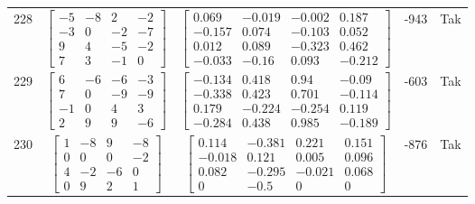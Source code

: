 \documentclass[a4paper,12pt]{article}
\begin{document}
\begin{tabular}{c c c c c}
228
&
$\begin{bmatrix} -5 & -8 & 2 & -2 \\ -3 & 0 & -2 & -7 \\ 9 & 4 & -5 & -2 \\ 7 & 3 & -1 & 0 \end{bmatrix}$
&
$\begin{bmatrix} 0.069 & -0.019 & -0.002 & 0.187 \\ -0.157 & 0.074 & -0.103 & 0.052 \\ 0.012 & 0.089 & -0.323 & 0.462 \\ -0.033 & -0.16 & 0.093 & -0.212 \end{bmatrix}$
&
-943
&
Tak
\\
229
&
$\begin{bmatrix} 6 & -6 & -6 & -3 \\ 7 & 0 & -9 & -9 \\ -1 & 0 & 4 & 3 \\ 2 & 9 & 9 & -6 \end{bmatrix}$
&
$\begin{bmatrix} -0.134 & 0.418 & 0.94 & -0.09 \\ -0.338 & 0.423 & 0.701 & -0.114 \\ 0.179 & -0.224 & -0.254 & 0.119 \\ -0.284 & 0.438 & 0.985 & -0.189 \end{bmatrix}$
&
-603
&
Tak
\\
230
&
$\begin{bmatrix} 1 & -8 & 9 & -8 \\ 0 & 0 & 0 & -2 \\ 4 & -2 & -6 & 0 \\ 0 & 9 & 2 & 1 \end{bmatrix}$
&
$\begin{bmatrix} 0.114 & -0.381 & 0.221 & 0.151 \\ -0.018 & 0.121 & 0.005 & 0.096 \\ 0.082 & -0.295 & -0.021 & 0.068 \\ 0 & -0.5 & 0 & 0 \end{bmatrix}$
&
-876
&
Tak
\\
\end{tabular} \egroup \newpage
\end{document}
